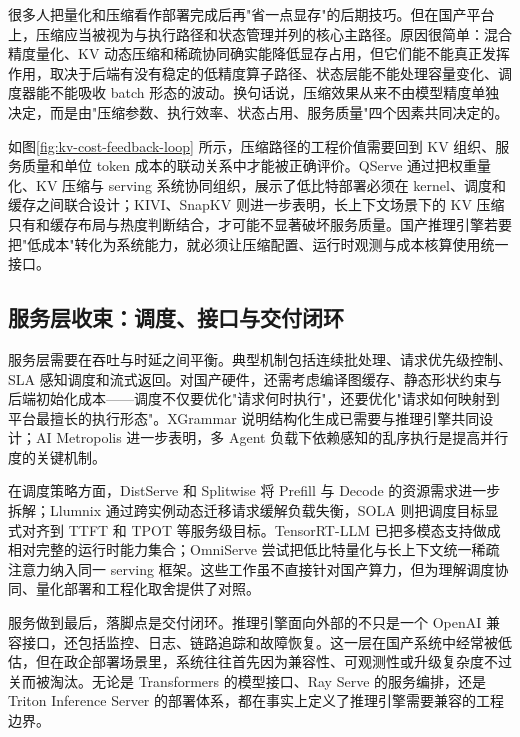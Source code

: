 很多人把量化和压缩看作部署完成后再"省一点显存"的后期技巧。但在国产平台上，压缩应当被视为与执行路径和状态管理并列的核心主路径。原因很简单：混合精度量化、KV 动态压缩和稀疏协同确实能降低显存占用，但它们能不能真正发挥作用，取决于后端有没有稳定的低精度算子路径、状态层能不能处理容量变化、调度器能不能吸收 batch 形态的波动。换句话说，压缩效果从来不由模型精度单独决定，而是由"压缩参数、执行效率、状态占用、服务质量"四个因素共同决定的。

如图\ref{fig:kv-cost-feedback-loop} 所示，压缩路径的工程价值需要回到 KV 组织、服务质量和单位 token 成本的联动关系中才能被正确评价。QServe 通过把权重量化、KV 压缩与 serving 系统协同组织，展示了低比特部署必须在 kernel、调度和缓存之间联合设计\citep{wang2024qserve}；KIVI、SnapKV 则进一步表明，长上下文场景下的 KV 压缩只有和缓存布局与热度判断结合，才可能不显著破坏服务质量\citep{liu2024kivi,li2024snapkv}。国产推理引擎若要把"低成本"转化为系统能力，就必须让压缩配置、运行时观测与成本核算使用统一接口。

\subsection{服务层收束：调度、接口与交付闭环}

\begingroup
\sloppy
服务层需要在吞吐与时延之间平衡。典型机制包括连续批处理、请求优先级控制、SLA 感知调度和流式返回。对国产硬件，还需考虑编译图缓存、静态形状约束与后端初始化成本——调度不仅要优化"请求何时执行"，还要优化"请求如何映射到平台最擅长的执行形态"。XGrammar 说明结构化生成已需要与推理引擎共同设计\citep{dong2024xgrammar}；AI Metropolis 进一步表明，多 Agent 负载下依赖感知的乱序执行是提高并行度的关键机制\citep{xie2025aimetropolis}。

在调度策略方面，DistServe 和 Splitwise 将 Prefill 与 Decode 的资源需求进一步拆解\citep{zhong2024distserve,splitwise2024}；Llumnix 通过跨实例动态迁移请求缓解负载失衡，SOLA 则把调度目标显式对齐到 TTFT 和 TPOT 等服务级目标\citep{sun2024llumnix,hong2025sola}。TensorRT-LLM 已把多模态支持做成相对完整的运行时能力集合\citep{tensorrtllmmultimodal2026}；OmniServe 尝试把低比特量化与长上下文统一稀疏注意力纳入同一 serving 框架\citep{omniserve2025}。这些工作虽不直接针对国产算力，但为理解调度协同、量化部署和工程化取舍提供了对照。

\endgroup

服务做到最后，落脚点是交付闭环。推理引擎面向外部的不只是一个 OpenAI 兼容接口，还包括监控、日志、链路追踪和故障恢复。这一层在国产系统中经常被低估，但在政企部署场景里，系统往往首先因为兼容性、可观测性或升级复杂度不过关而被淘汰。无论是 Transformers 的模型接口、Ray Serve 的服务编排，还是 Triton Inference Server 的部署体系，都在事实上定义了推理引擎需要兼容的工程边界\citep{transformers,rayserve,tritonserver}。

